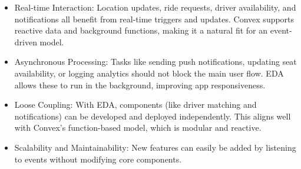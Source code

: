 \documentclass[12pt]{article}
\begin{document}
\begin{itemize}
  \item Real-time Interaction: Location updates, ride requests, driver availability, and notifications all benefit from real-time triggers and updates. Convex supports reactive data and background functions, making it a natural fit for an event-driven model.
  \item Asynchronous Processing: Tasks like sending push notifications, updating seat availability, or logging analytics should not block the main user flow. EDA allows these to run in the background, improving app responsiveness.
  \item Loose Coupling: With EDA, components (like driver matching and notifications) can be developed and deployed independently. This aligns well with Convex’s function-based model, which is modular and reactive.
  \item Scalability and Maintainability: New features can easily be added by listening to events without modifying core components.
\end{itemize}
\end{document}
